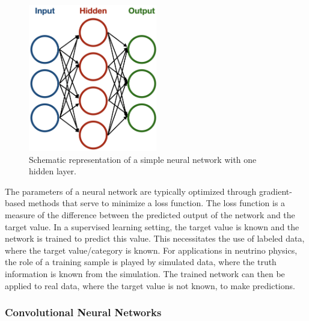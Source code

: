 \begin{figure}
    \centering
    \includegraphics[width=0.5\textwidth]{figures/mlreco/neural_network.png}
    \caption{Schematic representation of a simple neural network with one hidden layer.}
    \label{fig:neural_network}
\end{figure}

The parameters of a neural network are typically optimized through gradient-based methods that serve to minimize a loss function. The loss function is a measure of the difference between the predicted output of the network and the target value. In a supervised learning setting, the target value is known and the network is trained to predict this value. This necessitates the use of labeled data, where the target value/category is known. For applications in neutrino physics, the role of a training sample is played by simulated data, where the truth information is known from the simulation. The trained network can then be applied to real data, where the target value is not known, to make predictions. 

\subsubsection{Convolutional Neural Networks}
\label{sec:cnn}

